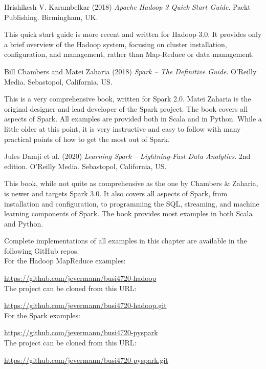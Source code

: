 \begin{resourcebox}
Hrishikesh V. Karambelkar (2018) \emph{Apache Hadoop 3 Quick Start Guide}. Packt Publishing. Birmingham, UK.
\end{resourcebox}

This quick start guide is more recent and written for Hadoop 3.0. It provides only a brief overview of the Hadoop system, focusing on cluster installation, configuration, and management, rather than Map-Reduce or data management.

\begin{resourcebox}
Bill Chambers and Matei Zaharia (2018) \emph{Spark -- The Definitive Guide}. O'Reilly Media. Sebastopol, California, US.
\end{resourcebox}

This is a very comprehensive book, written for Spark 2.0. Matei Zaharia is the original designer and lead developer of the Spark project. The book covers all aspects of Spark. All examples are provided both in Scala and in Python. While a little older at this point, it is very instructive and easy to follow with many practical points of how to get the most out of Spark.

\begin{resourcebox}
Jules Damji et al. (2020) \emph{Learning Spark -- Lightning-Fast Data Analytics}. 2nd edition. O'Reilly Media. Sebastopol, California, US.
\end{resourcebox}

This book, while not quite as comprehensive as the one by Chambers \& Zaharia, is newer and targets Spark 3.0. It also covers all aspects of Spark, from installation and configuration, to programming the SQL, streaming, and machine learning components of Spark. The book provides most examples in both Scala and Python.

\begin{resourcebox}
Complete implementations of all examples in this chapter are available in the following GitHub repos.\\

For the Hadoop MapReduce examples:

\small\url{https://github.com/jevermann/busi4720-hadoop}\normalsize \\

The project can be cloned from this URL:

\small\url{https://github.com/jevermann/busi4720-hadoop.git}\normalsize \\

For the Spark examples:

\small\url{https://github.com/jevermann/busi4720-pyspark}\normalsize \\

The project can be cloned from this URL:

\small\url{https://github.com/jevermann/busi4720-pyspark.git}\normalsize \\
\end{resourcebox}

